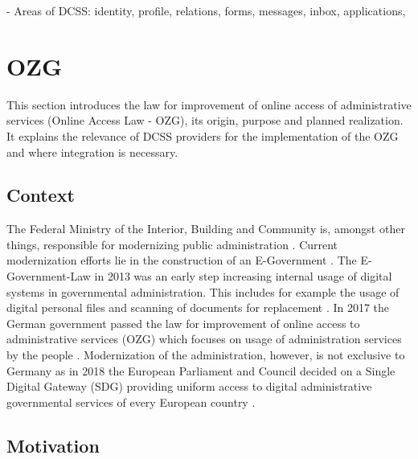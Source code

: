 \documentclass[
     12pt,         %
     a4paper,      %
     BCOR=10mm,version=first,     %
     DIV=14,version=first,        %
     ]{scrreprt}
\begin{document}

- Areas of DCSS: identity, profile, relations, forms, messages, inbox, applications, 



\section{OZG}

This section introduces the law for improvement of online access of administrative services (Online Access Law - OZG), its origin, purpose and planned realization. It explains the relevance of DCSS providers for the implementation of the OZG and where integration is necessary.

\subsection{Context}

The Federal Ministry of the Interior, Building and Community is, amongst other things, responsible for modernizing public administration \cite{BMI:Moderne_Verwaltung}. Current modernization efforts lie in the construction of an E-Government \cite{BMI:Behoerdengaenge}.
The E-Government-Law in 2013 was an early step increasing internal usage of digital systems in governmental administration. This includes for example the usage of digital personal files and scanning of documents for replacement \cite{BMI:E-Government_Gesetz}. 
In 2017 the German government passed the law for improvement of online access to administrative services (OZG) which focuses on usage of administration services by the people \cite{BMI:Onlinezugangsgesetz}. 
Modernization of the administration, however, is not exclusive to Germany as in 2018 the European Parliament and Council decided on a Single Digital Gateway (SDG) providing uniform access to digital administrative governmental services of every European country \cite{BMI:Single_Digital_Gateway}.

\subsection{Motivation}
\end{document}

